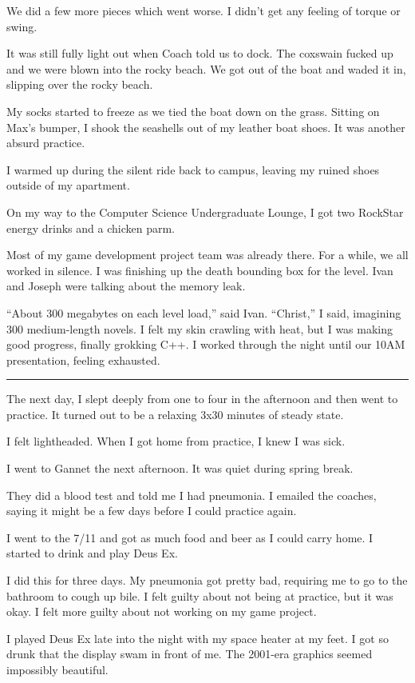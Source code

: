 We did a few more pieces which went worse.  I didn't get any feeling of torque
or swing.  

It was still fully light out when Coach told us to dock.  The coxswain fucked up
and we were blown into the rocky beach.  We got out of the boat and waded it in,
slipping over the rocky beach. 

My socks started to freeze as we tied the boat down on the grass.  Sitting on
Max's bumper, I shook the seashells out of my leather boat shoes.  It was
another absurd practice.  

I warmed up during the silent ride back to campus, leaving my ruined shoes
outside of my apartment.  

On my way to the Computer Science Undergraduate Lounge, I got two RockStar
energy drinks and a chicken parm.

Most of my game development project team was already there.  For a while, we all
worked in silence.  I was finishing up the death bounding box for the level.
Ivan and Joseph were talking about the memory leak.

``About 300 megabytes on each level load,'' said Ivan.  ``Christ,'' I said,
imagining 300 medium-length novels.  I felt my skin crawling with heat, but I
was making good progress, finally grokking C++.  I worked through the night
until our 10AM presentation, feeling exhausted.

\plainfancybreak{12pt}{2}{* * *}

The next day, I slept deeply from one to four in the afternoon and then went to
practice.  It turned out to be a relaxing 3x30 minutes of steady state.  

I felt lightheaded.  When I got home from practice, I knew I was sick.  

I went to Gannet the next afternoon.  It was quiet during spring break.

They did a blood test and told me I had pneumonia.  I emailed the coaches,
saying it might be a few days before I could practice again.

I went to the 7/11 and got as much food and beer as I could carry home.  I
started to drink and play Deus Ex.  

I did this for three days.  My pneumonia got pretty bad, requiring me to go to
the bathroom to cough up bile.  I felt guilty about not being at practice, but
it was okay.  I felt more guilty about not working on my game project. 
 
I played Deus Ex late into the night with my space heater at my feet.  I got so
drunk that the display swam in front of me.  The 2001-era graphics seemed
impossibly beautiful.  

